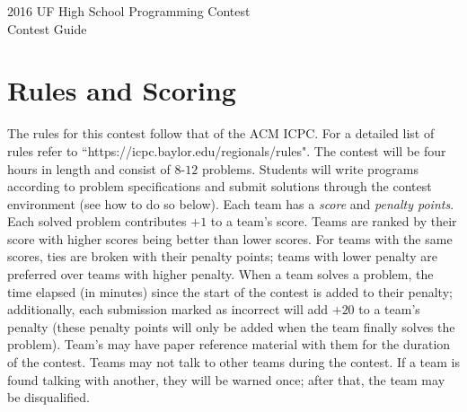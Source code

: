 \documentclass[a4paper,11pt]{article}
\begin{document}
\begin{center}
   {\Huge 2016 UF High School Programming Contest}\vspace{2 mm} \\			%
   {\huge Contest Guide}\vspace{2 mm} \\		%
\end{center}

\section*{Rules and Scoring}
The rules for this contest follow that of the ACM ICPC. For a detailed list of rules refer to ``https://icpc.baylor.edu/regionals/rules". The contest will be four hours in length and consist of $8$-$12$ problems. Students will write programs according to problem specifications and submit solutions through the contest environment (see how to do so below). Each team has a \emph{score} and \emph{penalty points}. Each solved problem contributes $+1$ to a team's score. Teams are ranked by their score with higher scores being better than lower scores. For teams with the same scores, ties are broken with their penalty points; teams with lower penalty are preferred over teams with higher penalty. When a team solves a problem, the time elapsed (in minutes) since the start of the contest is added to their penalty; additionally, each submission marked as incorrect will add $+20$ to a team's penalty (these penalty points will only be added when the team finally solves the problem).
Team's may have paper reference material with them for the duration of the contest. Teams may not talk to other teams during the contest. If a team is found talking with another, they will be warned once; after that, the team may be disqualified.
\end{document}
